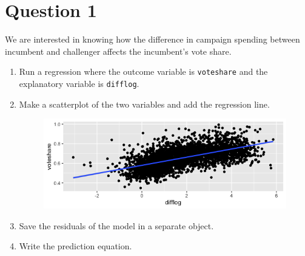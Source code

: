 \documentclass[12pt,letterpaper]{article}
\begin{document}
\section*{Question 1}
\vspace{.25cm}
\noindent We are interested in knowing how the difference in campaign spending between incumbent and challenger affects the incumbent's vote share. 
	\begin{enumerate}
		\item Run a regression where the outcome variable is \texttt{voteshare} and the explanatory variable is \texttt{difflog}.	\vspace{2cm}
		  
		\item Make a scatterplot of the two variables and add the regression line. 	\vspace{2cm}
		  
		\begin{figure}[ht]
			\centering
			\includegraphics[width=0.7\linewidth]{splot1}
			\caption{}
			\label{fig:splot1}
		\end{figure}
		
		\item Save the residuals of the model in a separate object.	\vspace{2cm}
		  
		\item Write the prediction equation.
		  
	\end{enumerate}
	
\newpage
\end{document}
